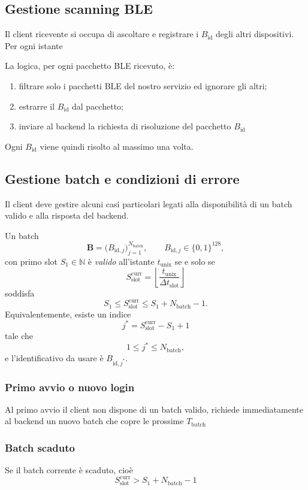 \documentclass[a4paper,11pt]{article}
\begin{document}
\subsection{Gestione scanning BLE}
Il client ricevente si occupa di ascoltare e registrare i $B_{\text{id}}$ degli altri dispositivi. Per ogni istante

La logica, per ogni pacchetto BLE ricevuto, è:
\begin{enumerate}
  \item filtrare solo i pacchetti BLE del nostro servizio ed ignorare gli altri;
  \item estrarre il $B_{\text{id}}$ dal pacchetto;
  \item inviare al backend la richiesta di risoluzione del pacchetto $B_{\text{id}}$
\end{enumerate}
Ogni $B_{\text{id}}$ viene quindi risolto al massimo una volta.

\subsection{Gestione batch e condizioni di errore}
Il client deve gestire alcuni casi particolari legati alla disponibilità di un batch valido e alla risposta del backend.

Un batch
\[
  \mathbf{B}
  = \bigl(B_{\text{id},j}\bigr)_{j=1}^{N_{\text{batch}}},
  \qquad B_{\text{id},j} \in \{0,1\}^{128},
\]
con primo slot \(S_1 \in \mathbb{N}\) è \emph{valido} all'istante \(t_{\text{unix}}\) se e solo se
\[
  S_{\text{slot}}^{\text{curr}}
  = \left\lfloor \frac{t_{\text{unix}}}{\Delta t_{\text{slot}}} \right\rfloor
\]
soddisfa
\[
  S_1 \le S_{\text{slot}}^{\text{curr}} \le S_1 + N_{\text{batch}} - 1.
\]
Equivalentemente, esiste un indice
\[
  j^\ast = S_{\text{slot}}^{\text{curr}} - S_1 + 1
\]
tale che
\[
  1 \le j^\ast \le N_{\text{batch}},
\]
e l'identificativo da usare è \(B_{\text{id},j^\ast}\).

\subsubsection{Primo avvio o nuovo login}
Al primo avvio il client non dispone di un batch valido, richiede immediatamente al backend un nuovo batch che copre le prossime $T_{\text{batch}}$

\subsubsection{Batch scaduto}
Se il batch corrente è scaduto, cioè
\[
  S_{\text{slot}}^{\text{curr}} > S_1 + N_{\text{batch}} - 1
\]
\end{document}
